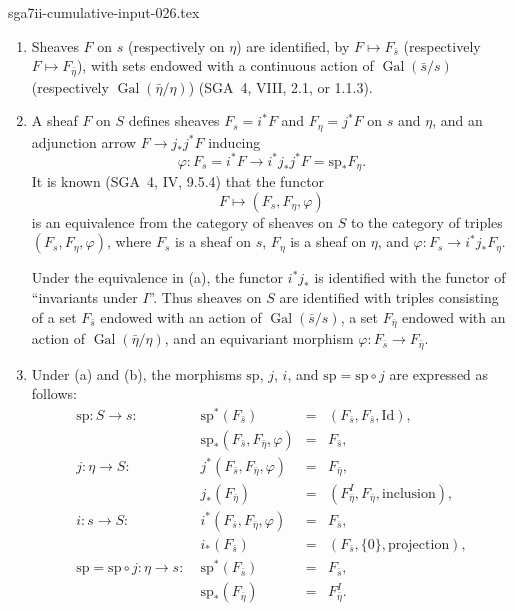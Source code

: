 \begin{filecontents*}{sga7ii-cumulative-input-026.tex}
\begin{enumerate}[label=(\alph*)]
\item Sheaves $F$ on $s$ (respectively on $\eta$) are identified, by
$F\mapsto F_{\bar s}$ (respectively $F\mapsto F_{\bar\eta}$), with
sets endowed with a continuous action of $\operatorname{Gal}(\bar s/s)$
(respectively $\operatorname{Gal}(\bar\eta/\eta)$) (SGA~4, VIII, 2.1,
or 1.1.3).

\item A sheaf $F$ on $S$ defines sheaves $F_s=i^*F$ and
$F_\eta=j^*F$ on $s$ and $\eta$, and an adjunction arrow
$F\longrightarrow j_*j^*F$ inducing
\begin{equation*}
\varphi:F_s=i^*F\longrightarrow i^*j_*j^*F
=\mathrm{sp}_*F_\eta.
\end{equation*}
It is known (SGA~4, IV, 9.5.4) that the functor
\begin{equation*}
F\longmapsto(F_s,F_\eta,\varphi)
\end{equation*}
is an equivalence from the category of sheaves on $S$ to the category
of triples $(F_s,F_\eta,\varphi)$, where $F_s$ is a sheaf on $s$,
$F_\eta$ is a sheaf on $\eta$, and
$\varphi:F_s\longrightarrow i^*j_*F_\eta$.

Under the equivalence in (a), the functor $i^*j_*$ is identified with
the functor of ``invariants under $I$''.  Thus sheaves on $S$ are
identified with triples consisting of a set $F_{\bar s}$ endowed with
an action of $\operatorname{Gal}(\bar s/s)$, a set $F_{\bar\eta}$
endowed with an action of $\operatorname{Gal}(\bar\eta/\eta)$, and an
equivariant morphism
$\varphi:F_{\bar s}\longrightarrow F_{\bar\eta}$.

\item Under (a) and (b), the morphisms $\mathrm{sp}$, $j$, $i$, and
$\mathrm{sp}=\mathrm{sp}\circ j$ are expressed as follows:
\begin{equation*}
\begin{array}{llcl}
\mathrm{sp}:S\longrightarrow s:\;&
 \mathrm{sp}^*(F_{\bar s})&=&(F_{\bar s},F_{\bar s},\mathrm{Id}),\\[2pt]
&\mathrm{sp}_*(F_{\bar s},F_{\bar\eta},\varphi)&=&F_{\bar s},\\[3pt]
j:\eta\longrightarrow S:\;&
 j^*(F_{\bar s},F_{\bar\eta},\varphi)&=&F_{\bar\eta},\\[2pt]
&j_*(F_{\bar\eta})&=&(F_{\bar\eta}^{I},F_{\bar\eta},
 \text{inclusion}),\\[3pt]
i:s\longrightarrow S:\;&
 i^*(F_{\bar s},F_{\bar\eta},\varphi)&=&F_{\bar s},\\[2pt]
&i_*(F_{\bar s})&=&(F_{\bar s},\{0\},\text{projection}),\\[3pt]
\mathrm{sp}=\mathrm{sp}\circ j:\eta\longrightarrow s:\;&
 \mathrm{sp}^*(F_{\bar s})&=&F_{\bar s},\\[2pt]
&\mathrm{sp}_*(F_{\bar\eta})&=&F_{\bar\eta}^{I}.
\end{array}
\end{equation*}
\end{enumerate}


\end{filecontents*}
